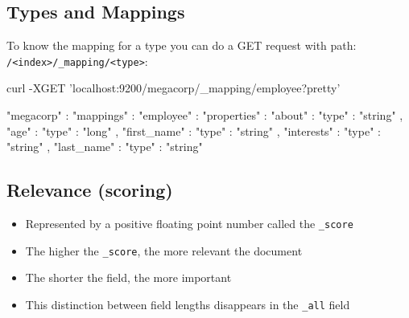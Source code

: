 \documentclass[]{beamer}
\begin{document}

  

\subsection{Types and Mappings}

\begin{frame}[containsverbatim]{\subsecname{}}
  To know the mapping for a type you can do a GET request with path: \texttt{/<index>/\_mapping/<type>}:

  \begin{command}
curl -XGET 'localhost:9200/megacorp/_mapping/employee?pretty'
  \end{command}
\end{frame}

\begin{frame}[containsverbatim]{\subsecname{}}
  \begin{command}
{
  "megacorp" : {
    "mappings" : {
      "employee" : {
        "properties" : {
          "about"      : { "type" : "string" },
          "age"        : { "type" : "long" },
          "first_name" : { "type" : "string" },
          "interests"  : { "type" : "string" },
          "last_name"  : { "type" : "string" }
        }
      }
    }
  }
}
  \end{command}
\end{frame}

\subsection{Relevance (scoring)}

\begin{frame}{\subsecname{}}
  \begin{itemize}
    \item Represented by a positive floating point number called the \texttt{\_score}
    \item The higher the \texttt{\_score}, the more relevant the document
    \item The shorter the field, the more important
    \item This distinction between field lengths disappears in the \texttt{\_all} field
  \end{itemize}
\end{frame}
\end{document}
